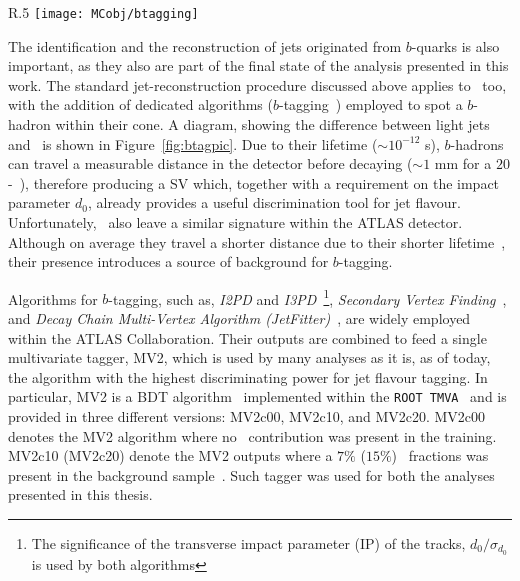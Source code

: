 			\begin{wrapfigure}{R}{.5\textwidth}
				\centering
				\texttt{[image: MCobj/btagging]}
				\caption{\label{fig:btagpic} Diagram showing the common principle of identification of jets initiated by $b$-quark decays~\cite{btagpic}.}
			\end{wrapfigure}

			The identification and the reconstruction of jets originated from $b$-quarks is also important, as they also are part of the final state of the analysis presented in this work. The standard jet-reconstruction procedure discussed above applies to \bjs\, too, with the addition of dedicated algorithms ($b$-tagging~\cite{Aad:2015ydr}) employed to spot a $b$-hadron within their cone. A diagram, showing the difference between light jets and \bjs\, is shown in Figure~\ref{fig:btagpic}. Due to their lifetime ($\sim 10^{-12}$ s), $b$-hadrons can travel a measurable distance in the detector before decaying ($\sim 1$ mm for a $20$-\GeV\ \bj), therefore producing a \ac{SV} which, together with a requirement on the impact parameter $d_0$, already provides a useful discrimination tool for jet flavour. Unfortunately, \cjs\ also leave a similar signature within the \ac{ATLAS} detector. Although on average they travel a shorter distance due to their shorter lifetime~\cite{ATL-PHYS-PUB-2015-001}, their presence introduces a source of background for $b$-tagging. 

			Algorithms for $b$-tagging, such as, \emph{I2PD} and \emph{I3PD}~\cite{Lehmacher:1128662}\footnote{The significance of the transverse impact parameter (IP) of the tracks, $d_0/\sigma_{d_0}$ is used by both algorithms}, \emph{Secondary Vertex Finding}~\cite{ATL-PHYS-PUB-2017-011}, and \emph{Decay Chain Multi-Vertex Algorithm (JetFitter)}~\cite{1742-6596-119-3-032032}, are widely employed within the \ac{ATLAS} Collaboration. Their outputs are combined to feed a single multivariate tagger, \ac{MV2}, which is used by many analyses as it is, as of today, the algorithm with the highest discriminating power for jet flavour tagging. In particular, \ac{MV2} is a \ac{BDT} algorithm~\cite{BDT} implemented within the \texttt{ROOT TMVA}~\cite{Brun:1997pa, 2007physics3039H} and is provided in three different versions: MV2c00, MV2c10, and MV2c20. MV2c00 denotes the MV2 algorithm where no \cj\ contribution was present in the training. MV2c10 (MV2c20) denote the MV2 outputs where a $7\%$ ($15\%$) \cj\ fractions was present in the background sample~\cite{Aad:2015ydr}. Such tagger was used for both the analyses presented in this thesis.

